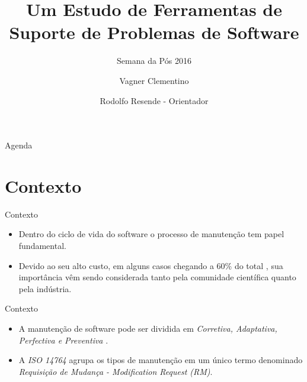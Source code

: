 \documentclass[t,14pt,mathserif]{beamer}
\title[] %
{Um Estudo de Ferramentas de Suporte de Problemas de Software}
\subtitle{Semana da Pós 2016}
\author[] %
{Vagner Clementino\\%
	\and Rodolfo Resende - Orientador%
	}
\institute[] %
{
  Departamento de Ciência da Computação\\
  Universidade Federal de Minas Gerais(UFMG)\\

  }
\date[2016/06/14] %
\begin{document}
\begin{frame}
  \titlepage
\end{frame}

\begin{frame}{Agenda}
  \tableofcontents
\end{frame}





\section{Contexto}

\begin{frame}{Contexto}

	\begin{itemize}
		\item Dentro do ciclo de vida do software o processo de manutenção tem papel fundamental.
		\item Devido ao seu alto custo, em alguns casos chegando a 60\% do total \cite{kaur2015review}, sua importância vêm sendo considerada tanto pela comunidade científica quanto pela indústria.
	\end{itemize}



\end{frame}

\begin{frame}{Contexto}

	\begin{itemize}
		\item A manutenção de software pode ser dividida em \textit{Corretiva, Adaptativa, Perfectiva e Preventiva} \cite{Lientz:1980:SMM:601062,159342}.
		\item A \textit{ISO 14764} \cite{1703974} agrupa os tipos de manutenção em um único termo denominado \textit{Requisição de Mudança - Modification Request (RM)}.
	\end{itemize}



\end{frame}
\end{document}
